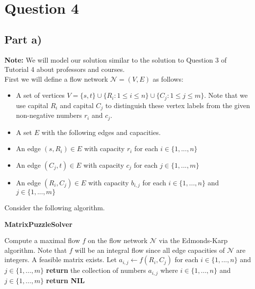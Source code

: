 \documentclass[12pt]{article}
\begin{document}
\newpage

\section*{Question 4}

\subsection*{Part a)}

\textbf{Note:} We will model our solution similar to the solution to Question 3 of Tutorial 4 about professors and courses. \\

First we will define a flow network $\mathcal{N} = (V,E)$ as follows: 

\begin{itemize}
    \item A set of vertices $V = \{s, t\} \cup \{R_i: 1 \leq i \leq n\} \cup \{C_j: 1 \leq j \leq m\}$. Note that we use capital $R_i$ and capital $C_j$ to distinguish these vertex labels from the given non-negative numbers $r_i$ and $c_j$. 
    
    \item A set $E$ with the following edges and capacities. 
    
    \item An edge $(s, R_i) \in E$ with capacity $r_i$ for each $i \in \{1,...,n\}$
    
    \item An edge $(C_j, t) \in E$ with capacity $c_j$ for each $j \in \{1,...,m\}$ 
    
    \item An edge $(R_i, C_j) \in E$ with capacity $b_{i,j}$ for each $i \in \{1,...,n\}$ and $j \in \{1,...,m\}$
\end{itemize}

Consider the following algorithm. 

\begin{algorithm}[hbt!]
\caption{\textbf{MatrixPuzzleSolver}}\label{alg:cap}

\begin{algorithmic}[1]
\State Compute a maximal flow $f$ on the flow network $\mathcal{N}$ via the Edmonds-Karp algorithm. Note that $f$ will be an integral flow since all edge capacities of $\mathcal{N}$ are integers. 
\State 
{}
    \State A feasible matrix exists.
    \State Let $a_{i,j} \gets f(R_i,C_j)$ for each $i \in \{1,...,n\}$ and $j \in \{1,...,m\}$
    \State \textbf{return} the collection of numbers $a_{i,j}$ where $i \in \{1,...,n\}$ and $j \in \{1,...,m\}$
\Else 
    \State \textbf{return NIL} 
\EndIf
\end{algorithmic}
\end{algorithm}
\end{document}
